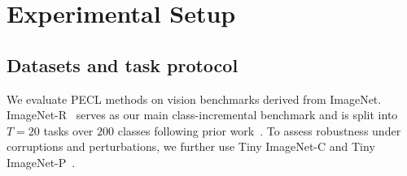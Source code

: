 \documentclass{article}
\theoremstyle{plain}
\theoremstyle{definition}
\theoremstyle{remark}
\begin{document}







\section{Experimental Setup}






\subsection{Datasets and task protocol}

We evaluate PECL methods on vision benchmarks derived from ImageNet. ImageNet-R~\cite{ImagenetR_Hendrycks_2021_ICCV} serves as our main class-incremental benchmark and is split into $T=20$ tasks over $200$ classes following prior work~\cite{liangInfLoRAInterferenceFreeLowRank2024a}. To assess robustness under corruptions and perturbations, we further use Tiny ImageNet-C and Tiny ImageNet-P~\cite{hendrycks2018benchmarking}. 
\end{document}
